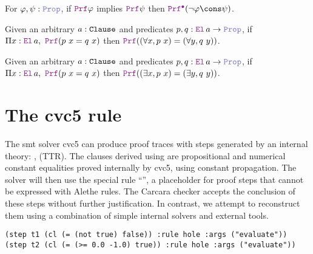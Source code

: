\begin{lemma}[$\kw{subproof}_1$]\label{lem:subproof}
For $\varphi, \psi : \prop{}$, if $\prf{} \varphi$ implies $\prf{} \psi$ then $\pid (\neg \varphi \cons \psi)$.
\end{lemma}


\begin{lemma}\label{lem:bind-forall}
Given an arbitrary $a : \texttt{\upshape{Clause}}$ and predicates $p, q : \el{}\,a \ra \prop$, if $\Pi x : \el{}\,a,~ \prf (p~x = q~x)$ then $\prf ((\forall x, p~x) = (\forall y, q~y))$.
\end{lemma}


\begin{lemma}\label{lem:bind-exists}
  Given an arbitrary $a : \texttt{\upshape{Clause}}$ and predicates $p, q : \el{}\,a \ra \prop$, if $\Pi x : \el{}\,a,~ \prf (p~x = q~x)$ then $\prf ((\exists x, p~x) = (\exists y, q~y))$.
\end{lemma}

\section{The \texttt{} cvc5 rule}
\label{ssec:eval-recon}

The smt solver cvc5 can produce proof traces with steps generated by an internal theory: ,  (TTR).
The clauses derived using  are propositional and numerical constant equalities proved internally by cvc5, using constant propagation.
The solver will then use the special rule ``'', a placeholder for proof steps that cannot be expressed with Alethe rules.
The Carcara checker accepts the conclusion of these  steps without further justification.
In contrast, we attempt to reconstruct them using a combination of simple internal solvers and external tools.

\smallskip

\begin{lstlisting}[language=SMT,caption={An example of proof trace using the cvc5 $\kw{evaluate}$ rule.},label={lst:eval-step}]
(step t1 (cl (= (not true) false)) :rule hole :args ("evaluate"))
(step t2 (cl (= (>= 0.0 -1.0) true)) :rule hole :args ("evaluate"))
\end{lstlisting}

\smallskip


